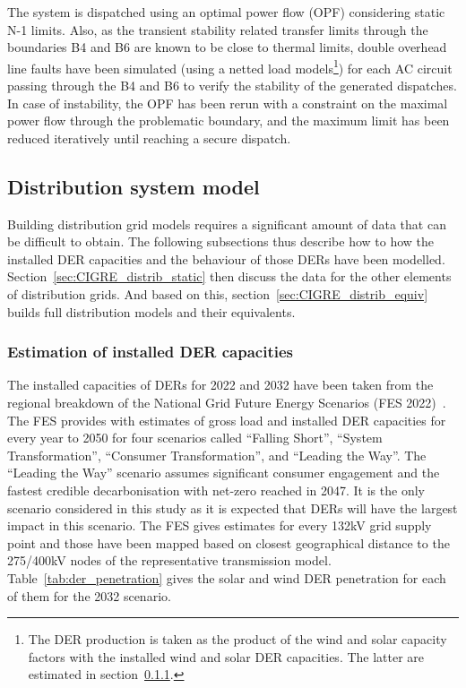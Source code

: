 The system is dispatched using an optimal power flow (OPF) considering static N-1 limits. Also, as the transient stability related transfer limits through the boundaries B4 and B6 are known to be close to thermal limits, double overhead line faults have been simulated (using a netted load models\footnote{The DER production is taken as the product of the wind and solar capacity factors with the installed wind and solar DER capacities. The latter are estimated in section~\ref{sec:CIGRE_distrib_capacity}.}) for each AC circuit passing through the B4 and B6 to verify the stability of the generated dispatches. In case of instability, the OPF has been rerun with a constraint on the maximal power flow through the problematic boundary, and the maximum limit has been reduced iteratively until reaching a secure dispatch.


\subsection{Distribution system model}
\label{sec:CIGRE_distrib}

Building distribution grid models requires a significant amount of data that can be difficult to obtain. The following subsections thus describe how to how the installed DER capacities and the behaviour of those DERs have been modelled. Section~\ref{sec:CIGRE_distrib_static} then discuss the data for the other elements of distribution grids. And based on this, section~\ref{sec:CIGRE_distrib_equiv} builds full distribution models and their equivalents.

\subsubsection{Estimation of installed DER capacities}
\label{sec:CIGRE_distrib_capacity}

The installed capacities of DERs for 2022 and 2032 have been taken from the regional breakdown of the National Grid Future Energy Scenarios (FES 2022)~\cite{FES_regional}. The FES provides with estimates of gross load and installed DER capacities for every year to 2050 for four scenarios called ``Falling Short'', ``System Transformation'', ``Consumer Transformation'', and ``Leading the Way''. The ``Leading the Way'' scenario assumes significant consumer engagement and the fastest credible decarbonisation with net-zero reached in 2047. It is the only scenario considered in this study as it is expected that DERs will have the largest impact in this scenario. The FES gives estimates for every 132kV grid supply point and those have been mapped based on closest geographical distance to the 275/400kV nodes of the representative transmission model. Table~\ref{tab:der_penetration} gives the solar and wind DER penetration for each of them for the 2032 scenario.

